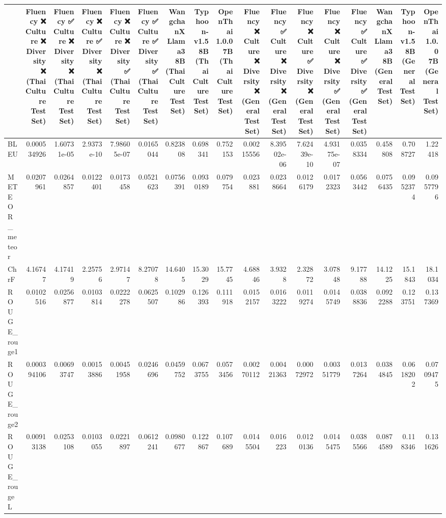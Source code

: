 \begin{tabular}{lrrrrrrrrrrrrrrrr}
\hline
                 &             Fluency ❌
 Culture ❌
 Diversity ❌
(Thai Culture Test Set) &             Fluency ✅
 Culture ❌
 Diversity ❌
(Thai Culture Test Set) &            Fluency ❌
 Culture ✅
 Diversity ❌
(Thai Culture Test Set) &             Fluency ❌
 Culture ❌
 Diversity ✅
(Thai Culture Test Set) &           Fluency ✅
 Culture ✅
 Diversity ✅
(Thai Culture Test Set) &            WangchanX Llama3 8B
(Thai Culture Test Set) &            Typhoon-v1.5 8B
(Thai Culture Test Set) &            OpenThai 1.0.0 7B
(Thai Culture Test Set) &            Fluency ❌
 Culture ❌
 Diversity ❌
(General Test Set) &             Fluency ✅
 Culture ❌
 Diversity ❌
(General Test Set) &             Fluency ❌
 Culture ✅
 Diversity ❌
(General Test Set) &             Fluency ❌
 Culture ❌
 Diversity ✅
(General Test Set) &           Fluency ✅
 Culture ✅
 Diversity ✅
(General Test Set) &            WangchanX Llama3 8B
(General Test Set) &            Typhoon-v1.5 8B
(General Test Set) &            OpenThai 1.0.0 7B
(General Test Set) \\
\hline
 BLEU            & 0.000534926 & 1.60731e-05 & 2.9373e-10 & 7.98605e-07 & 0.0165044 &  0.823808  &  0.698341  &  0.752153  & 0.00215556 & 8.39502e-06 & 7.62439e-10 & 4.93175e-07 & 0.0358334 &  0.458808  &  0.708727  &  1.22418   \\
 METEOR_meteor   & 0.0207961   & 0.0264857   & 0.0122401  & 0.0173458   & 0.0521623 &  0.0756391 &  0.0930189 &  0.079754  & 0.023881   & 0.0238664   & 0.0126179   & 0.0172323   & 0.0563442 &  0.0756435 &  0.0952374 &  0.0957796 \\
 ChrF            & 4.16747     & 4.17419     & 2.25756    & 2.97147     & 8.27078   & 14.6405    & 15.3029    & 15.7745    & 4.68846    & 3.9328      & 2.32872     & 3.07848     & 9.17788   & 14.1225    & 15.1843    & 18.1034    \\
 ROUGE_rouge1    & 0.0102516   & 0.0256877   & 0.0103814  & 0.0222278   & 0.0625507 &  0.102986  &  0.126393  &  0.111918  & 0.0152157  & 0.0163222   & 0.0119274   & 0.0145749   & 0.0388836 &  0.0922288 &  0.123751  &  0.137369  \\
 ROUGE_rouge2    & 0.000394106 & 0.00693747  & 0.00153886 & 0.00451958  & 0.0246696 &  0.0459752 &  0.0673755 &  0.0573456 & 0.00270112 & 0.00421363  & 0.00072972  & 0.00351779  & 0.0137264 &  0.0384845 &  0.0618202 &  0.0709475 \\
 ROUGE_rougeL    & 0.00913138  & 0.0253108   & 0.0103055  & 0.0221897   & 0.0612241 &  0.0980677 &  0.122867  &  0.107689  & 0.0145504  & 0.016223    & 0.0120136   & 0.0145475   & 0.0385566 &  0.0874589 &  0.118346  &  0.131626  \\

\end{tabular}
